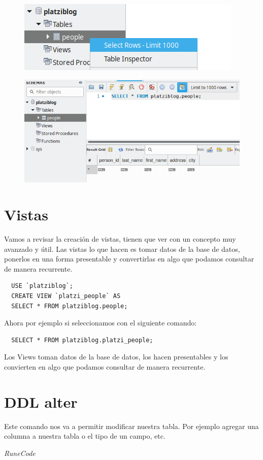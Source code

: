 \documentclass{article}
\begin{document}
\begin{figure}[h!]
  \centering
  \includegraphics[scale=0.75]{./Pictures/048_selec.png}
\end{figure}

\begin{figure}[h!]
  \centering
  \includegraphics[scale=0.75]{./Pictures/049_select.png}
\end{figure}

\section{Vistas}%
Vamos a revisar la creación de vistas, tienen que ver con un concepto muy
avanzado y útil. Las vistas lo que hacen es tomar datos de la base de datos,
ponerlos en una forma presentable y convertirlas en algo que podamos consultar
de manera recurrente.\\

\begin{verbatim}
  USE `platziblog`;
  CREATE VIEW `platzi_people` AS
  SELECT * FROM platziblog.people;
\end{verbatim}

Ahora por ejemplo si seleccionamos con el siguiente comando:

\begin{verbatim}
  SELECT * FROM platziblog.platzi_people;
\end{verbatim}

Los Views toman datos de la base de datos, los hacen presentables y los
convierten en algo que podamos consultar de manera recurrente.

\section{DDL alter}%
Este comando nos va a permitir modificar nuestra tabla. Por ejemplo agregar una
columna a nuestra tabla o el tipo de un campo, etc.


\vspace{2cm}
\LARGE\textit{RuneCode}
\end{document}
